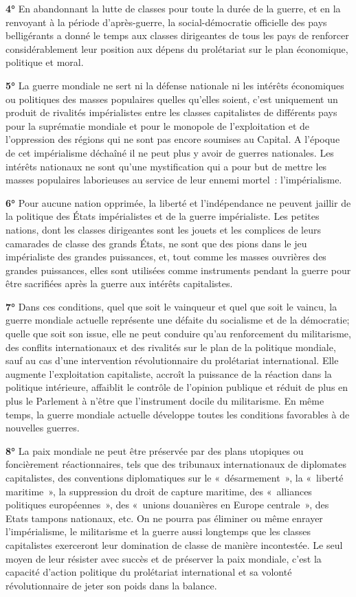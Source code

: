 \documentclass[french,twoside]{book} %
\begin{document}
\textbf{4°} En abandonnant la lutte de classes pour toute la durée de la guerre, et en la renvoyant à la période d’après-guerre, la social-démocratie officielle des pays belligérants a donné le temps aux classes dirigeantes de tous les pays de renforcer considérablement leur position aux dépens du prolétariat sur le plan économique, politique et moral.\par
\textbf{5°} La guerre mondiale ne sert ni la défense nationale ni les intérêts économiques ou politiques des masses populaires quelles qu’elles soient, c’est uniquement un produit de rivalités impérialistes entre les classes capitalistes de différents pays pour la suprématie mondiale et pour le monopole de l’exploitation et de l’oppression des régions qui ne sont pas encore soumises au Capital. A l’époque de cet impérialisme déchaîné il ne peut plus y avoir de guerres nationales. Les intérêts nationaux ne sont qu’une mystification qui a pour but de mettre les masses populaires laborieuses au service de leur ennemi mortel : l’impérialisme.\par
\textbf{6°} Pour aucune nation opprimée, la liberté et l’indépendance ne peuvent jaillir de la politique des États impérialistes et de la guerre impérialiste. Les petites nations, dont les classes dirigeantes sont les jouets et les complices de leurs camarades de classe des grands États, ne sont que des pions dans le jeu impérialiste des grandes puissances, et, tout comme les masses ouvrières des grandes puissances, elles sont utilisées comme instruments pendant la guerre pour être sacrifiées après la guerre aux intérêts capitalistes.\par
\textbf{7°} Dans ces conditions, quel que soit le vainqueur et quel que soit le vaincu, la guerre mondiale actuelle représente une défaite du socialisme et de la démocratie; quelle que soit son issue, elle ne peut conduire qu’au renforcement du militarisme, des conflits internationaux et des rivalités sur le plan de la politique mondiale, sauf au cas d’une intervention révolutionnaire du prolétariat international. Elle augmente l’exploitation capitaliste, accroît la puissance de la réaction dans la politique intérieure, affaiblit le contrôle de l’opinion publique et réduit de plus en plus le Parlement à n’être que l’instrument docile du militarisme. En même temps, la guerre mondiale actuelle développe toutes les conditions favorables à de nouvelles guerres.\par
\textbf{8°} La paix mondiale ne peut être préservée par des plans utopiques ou foncièrement réactionnaires, tels que des tribunaux internationaux de diplomates capitalistes, des conventions diplomatiques sur le « désarmement », la « liberté maritime », la suppression du droit de capture maritime, des « alliances politiques européennes », des « unions douanières en Europe centrale », des Etats tampons nationaux, etc. On ne pourra pas éliminer ou même enrayer l’impérialisme, le militarisme et la guerre aussi longtemps que les classes capitalistes exerceront leur domination de classe de manière incontestée. Le seul moyen de leur résister avec succès et de préserver la paix mondiale, c’est la capacité d’action politique du prolétariat international et sa volonté révolutionnaire de jeter son poids dans la balance.\par
\end{document}
